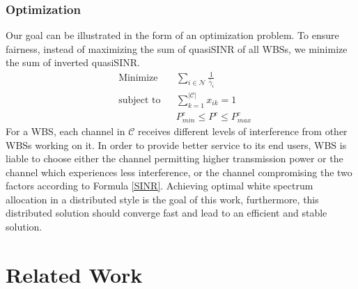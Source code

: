 \subsubsection*{Optimization}
Our goal can be illustrated in the form of an optimization problem.
To ensure fairness, instead of maximizing the sum of quasiSINR of all WBSs, we minimize the sum of inverted quasiSINR. 
	\begin{equation}
\label{problem}
			\begin{aligned}
			& {\text{Minimize}}
			& & \sum_{i\in \mathcal{N}}\frac{1}{\tilde{\gamma_{i}}} \\
			& \text{subject to}
			& & \sum_{k=1}^{|\mathcal{C}|}x_{ik}=1 \\
			& & & P_{min}^c \leq P^c \leq P_{max}^c
			\end{aligned}
		\end{equation}
For a WBS, each channel in $\mathcal{C}$ receives different levels of interference from other WBSs working on it.
In order to provide better service to its end users, WBS is liable to choose either the channel permitting higher transmission power or the channel which experiences less interference, or the channel compromising the two factors according to Formula \ref{SINR}.
 Achieving optimal white spectrum allocation in a distributed style is the goal of this work, furthermore, this distributed solution should converge fast and lead to an efficient and stable solution.


\section{Related Work}
\label{relatedWork}

